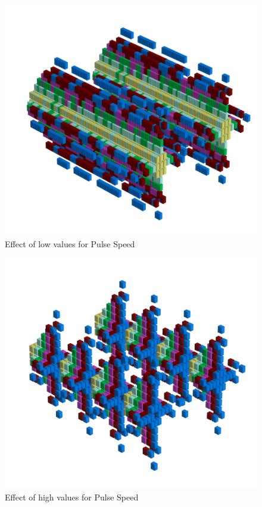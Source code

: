\begin{figure}[H]
    \centering
    \begin{adjustbox}{width=14cm,center}
      \includegraphics[width=14cm]{src/pulsespeed/pattern0-45.png}%
    \end{adjustbox}
    \caption{Effect of low values for Pulse Speed}
\end{figure}
\begin{figure}[H]
    \centering
    \begin{adjustbox}{width=14cm,center}
      \includegraphics[width=14cm]{src/pulsespeed/pattern1-45.png}%
    \end{adjustbox}
    \caption{Effect of high values for Pulse Speed}
\end{figure}

